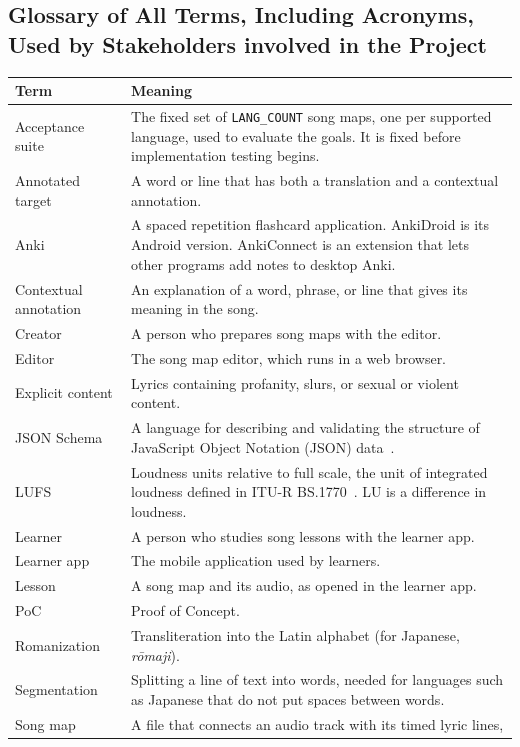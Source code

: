 \documentclass[12pt]{article}
\newcommand{\cn}[1]{\texttt{#1}}
\begin{document}
\subsection{Glossary of All Terms, Including Acronyms, Used by Stakeholders involved in the Project} \label{SecGlossary}
\begin{longtable}{@{}P{0.27\textwidth}P{0.68\textwidth}@{}}
\toprule
\textbf{Term} & \textbf{Meaning}\\
\midrule
\endhead
Acceptance suite & The fixed set of \cn{LANG\_COUNT} song maps, one per
supported language, used to evaluate the goals. It is fixed before
implementation testing begins.\\
Annotated target & A word or line that has both a translation and a contextual
annotation.\\
Anki & A spaced repetition flashcard application. AnkiDroid is its Android
version. AnkiConnect is an extension that lets other programs add notes to desktop
Anki.\\
Contextual annotation & An explanation of a word, phrase, or line that gives
its meaning in the song.\\
Creator & A person who prepares song maps with the editor.\\
Editor & The song map editor, which runs in a web browser.\\
Explicit content & Lyrics containing profanity, slurs, or sexual or violent
content.\\
JSON Schema & A language for describing and validating the structure of JavaScript Object Notation (JSON)
data~\cite{JSONSchema2020}.\\
LUFS & Loudness units relative to full scale, the unit of integrated loudness
defined in ITU-R BS.1770~\cite{BS1770}. LU is a difference in loudness.\\
Learner & A person who studies song lessons with the learner app.\\
Learner app & The mobile application used by learners.\\
Lesson & A song map and its audio, as opened in the learner app.\\
PoC & Proof of Concept.\\
Romanization & Transliteration into the Latin alphabet (for Japanese,
\emph{r\=omaji}).\\
Segmentation & Splitting a line of text into words, needed for languages such
as Japanese that do not put spaces between words.\\
Song map & A file that connects an audio track with its timed lyric lines,

\end{longtable}
\end{document}
